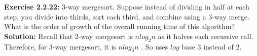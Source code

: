 \documentclass[11pt,fleqn]{article}
\begin{document}
\textbf{Exercise 2.2.22:} 3-way mergesort. Suppose instead of dividing in half at each step, you divide
into thirds, sort each third, and combine using a 3-way merge. What is the order of
growth of the overall running time of this algorithm?\\

\textbf{Solution:}
Recall that 2-way mergesort is $nlog_2n$ as it halves each recursive call. Therefore, for 3-way mergesort, it is $nlog_3n$ . So uses $log$ base 3 instead of 2.
\end{document}
